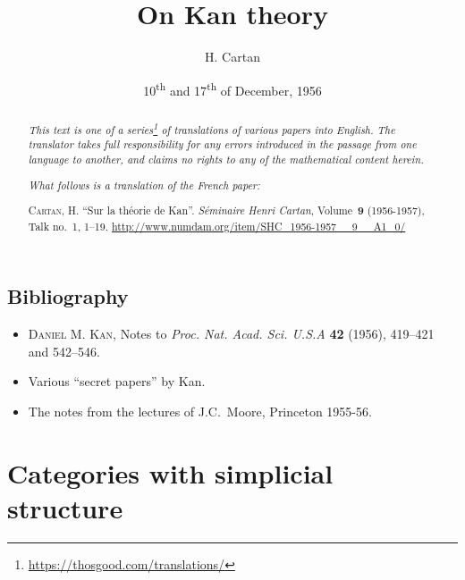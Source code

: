 \documentclass{article}
\title{On Kan theory}
\author{H. Cartan}
\date{10\textsuperscript{th} and 17\textsuperscript{th} of December, 1956}
\theoremstyle{plain}
\theoremstyle{definition}
\newcommand{\oldpage}[1]{\marginpar{\footnotesize$\Big\vert$ \textit{p.~#1}}}
\begin{document}
\maketitle
\thispagestyle{fancy}

\renewcommand{\abstractname}{Translator's note.}

\begin{abstract}
  \renewcommand*{\thefootnote}{\fnsymbol{footnote}}
  \emph{This text is one of a series\footnote{\url{https://thosgood.com/translations/}} of translations of various papers into English.}
  \emph{The translator takes full responsibility for any errors introduced in the passage from one language to another, and claims no rights to any of the mathematical content herein.}

  \medskip
  
  \emph{What follows is a translation of the French paper:}

  \medskip\noindent
  \textsc{Cartan, H.}
  ``Sur la th\'{e}orie de Kan''.
  \emph{S\'{e}minaire Henri Cartan}, Volume~\textbf{9} (1956-1957), Talk no.~1, 1–19.
  {\url{http://www.numdam.org/item/SHC_1956-1957__9__A1_0/}}
\end{abstract}

\setcounter{footnote}{0}

\tableofcontents
\bigskip



\oldpage{1-01}
\subsection*{Bibliography}

\begin{itemize}
  \item \textsc{Daniel M. Kan}, Notes to \emph{Proc. Nat. Acad. Sci. U.S.A} \textbf{42} (1956), 419--421 and 542--546.
  \item Various ``secret papers'' by Kan.
  \item The notes from the lectures of J.C.~Moore, Princeton 1955-56.
\end{itemize}


\section{Categories with simplicial structure}
\label{section1}
\end{document}
